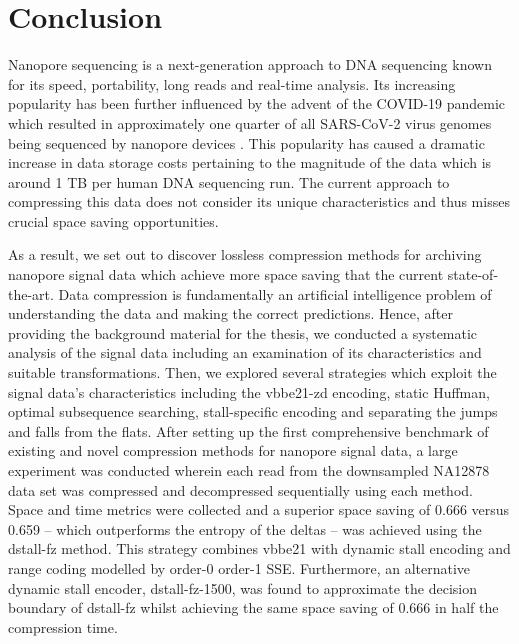 \chapter{Conclusion} \label{chap:conclusion}

Nanopore sequencing is a next-generation approach to DNA sequencing known for
its speed, portability, long reads and real-time analysis. Its increasing
popularity has been further influenced by the advent of the COVID-19 pandemic
which resulted in approximately one quarter of all SARS-CoV-2 virus genomes
being sequenced by nanopore devices \cite{lara}. This popularity has caused a
dramatic increase in data storage costs pertaining to the magnitude of the data
which is around 1 TB per human DNA sequencing run.
The current approach to compressing this data does not consider its
unique characteristics and thus misses crucial space saving opportunities.

As a result, we set out to discover lossless compression methods for archiving
nanopore signal data which achieve more space saving that the current
state-of-the-art.
Data compression is fundamentally an artificial intelligence problem of
understanding the data and making the correct predictions. Hence, after
providing the background material for the thesis, we conducted a systematic
analysis of the signal data including an examination of its characteristics and
suitable transformations.
Then, we explored several strategies which exploit the signal data's
characteristics including the vbbe21-zd encoding, static Huffman, optimal
subsequence searching, stall-specific encoding and separating the jumps and
falls from the flats.
After setting up the first comprehensive benchmark of existing and novel
compression methods for nanopore signal data, a large experiment was conducted
wherein each read from the downsampled NA12878 data set was compressed and
decompressed sequentially using each method.
Space and time metrics were collected and a superior space saving of 0.666
versus 0.659 -- which outperforms the entropy of the deltas -- was achieved
using the dstall-fz method. This strategy combines vbbe21 with dynamic stall
encoding and range coding modelled by order-0 order-1 SSE. Furthermore, an
alternative dynamic stall encoder, dstall-fz-1500, was found to approximate the
decision boundary of dstall-fz whilst achieving the same space saving of 0.666 in
half the compression time.
